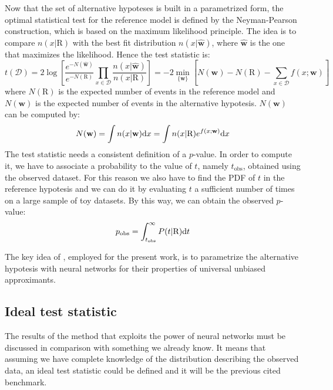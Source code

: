 Now that the set of alternative hypoteses is built in a parametrized form, the optimal statistical test for the reference model is defined by the Neyman-Pearson construction, which is based on the maximum likelihood principle. The idea is to compare $n(x|\mathrm{R})$ with the best fit distribution $n(x|\hat{\mathbf{w}})$, where $\hat{\mathbf{w}}$ is the one that maximizes the likelihood. Hence the test statistic is:
\begin{equation}
	\label{eqn:T}
	t(\mathcal{D}) = 2 \log{\left[
	\frac{e^{-N(\hat{\mathbf{w}})}}{e^{-N(\mathrm{R})}} \prod_{x \in \mathcal{D}} \frac{n(x|\hat{\mathbf{w}})}{n(x|\mathrm{R})}
	\right]}
	=
	-2 \min_{\{\mathbf{w}\}}{\left[
	N(\mathbf{w}) - N(\mathrm{R}) - \sum_{x \in \mathcal{D}} f(x;\mathbf{w})
	\right]}
\end{equation}
where $N(\mathrm{R})$ is the expected number of events in the reference model  and $N(\mathbf{w})$ is the expected number of events in the alternative hypotesis. $N(\mathbf{w})$ can be computed by:
\begin{equation}
	N(\mathbf{w}) = \int n(x|\mathbf{w}) \mathrm{d} x = \int n(x|\mathrm{R}) e^{f(x;\mathbf{w})} \mathrm{d} x
\end{equation}
The test statistic needs a consistent definition of a $p$-value. In order to compute it, we have to associate a probability to the value of $t$, namely $t_\mathrm{obs}$, obtained using the observed dataset. For this reason we also have to find the PDF of $t$ in the reference hypotesis and we can do it by evaluating $t$ a sufficient number of times on a large sample of toy datasets. By this way, we can obtain the observed $p$-value:
\begin{equation}
	p_\mathrm{obs} = \int_{t_\mathrm{obs}}^{\infty} P(t|\mathrm{R}) \mathrm{d} t
\end{equation}

The key idea of \cite{wulzer}, employed for the present work, is to parametrize the alternative hypotesis with neural networks for their properties of universal unbiased approximants.



\subsection{Ideal test statistic}
The results of the method that exploits the power of neural networks must be discussed in comparison with something we already know. It means that assuming we have complete knowledge of the distribution describing the observed data, an ideal test statistic could be defined and it will be the previous cited benchmark.

